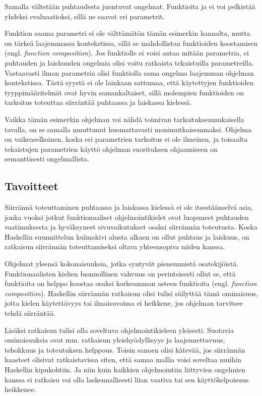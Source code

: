 \documentclass[finnish]{tktltiki2}
\begin{document}
Samalla vältetään puhtaudesta juontuvat ongelmat. Funktioita  ja 
ei voi pelkistää yhdeksi evaluaatioksi, sillä ne saavat eri parametrit.

Funktion  saama parametri  ei ole välttämätön tämän esimerkin kannalta,
mutta on tärkeä laajemmassa kontekstissa, sillä se mahdollistaa funktioiden koostamisen (engl.
\emph{function composition}). Jos funktiolle  ei voisi antaa mitään parametria, ei
puhtauden ja laiskuuden ongelmia olisi voitu ratkaista tekaistuilla parametreilla. Vastaavasti ilman
parametria  olisi funktiolla  sama ongelma laajemman ohjelman
kontekstissa. Tästä syystä ei ole lainkaan sattumaa, että käytettyjen funktioiden tyyppimääritelmät
ovat hyvin samankaltaiset, sillä molempien funktioiden on tarkoitus toteuttaa siirräntää puhtaassa
ja laiskassa kielessä.

Vaikka tämän esimerkin ohjelman voi nähdä toimivan tarkoituksenmukaisella tavalla, on se samalla
muuttunut huomattavasti monimutkaisemmaksi. Ohjelma on vaikeaselkoinen, koska eri parametrien
tarkoitus ei ole ilmeinen, ja toisaalta tekaistujen parametrien käyttö ohjelman suorituksen
ohjaamiseen on semanttisesti ongelmallista.

\subsection{Tavoitteet}

Siirrännä toteuttaminen puhtaassa ja laiskassa kielessä ei ole itsestäänselvä asia, jonka vuoksi
jotkut funktionaaliset ohjelmointikielet ovat luopuneet puhtauden vaatimuksesta ja hyväksyneet
sivuvaikutukset osaksi siirrännän toteutusta. Koska Haskellin suunnittelun kulmakivi alusta alkaen
on ollut puhtaus ja laiskuus, on ratkaisun siirrännän toteuttamiseksi oltava yhteensopiva niiden
kanssa.

Ohjelmat yleensä kokonaisuuksia, jotka syntyvät pienemmistä osatekijöistä. Funktionaalisten kielien
luonnollinen vahvuus on perinteisesti ollut se, että funktioita on helppo koostaa osaksi korkeamman
asteen funktioita (engl. \emph{function composition}). Haskellin siirrännän ratkaisun olisi tulisi
säilyttää tämä ominaisuus, jotta kielen käytettävyys tai ilmaisuvoima ei heikkene, jos ohjelman
tarvitsee tehdä siirräntää.

Lisäksi ratkaisun tulisi olla soveltuva ohjelmointikieleen yleisesti. Suotavia ominaisuuksia ovat
mm. ratkaisun yleishyödyllisyys ja laajennettavuus, tehokkuus ja toteutuksen helppous. Toisin sanoen
olisi kätevää, jos siirrännän haasteet olisivat ratkaistavissa siten, että samaa mallia voisi
soveltaa muihin Haskellin kipukohtiin. Ja niin kuin kaikkien ohjelmointiin liittyvien ongelmien
kanssa ei ratkaisu voi olla laskennallisesti liian vaativa tai sen käyttökelpoisuus heikkenee.
\end{document}
